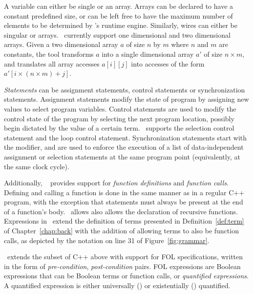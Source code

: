 A variable can either be single or an array. Arrays can be declared to 
have a constant predefined size, or can be left free to have the maximum
number of elements to be determined by \mytool's runtime engine.
Similarly, wires can either be singular or arrays. 
\mytool~currently support one dimensional and two dimensional arrays. 
Given a two dimensional array $a$ of size $n$ by $m$ where $n$ and $m$ are constants, 
the tool transforms $a$ into a single dimensional array $a'$ of size 
$n \times m$, and translates all array accesses $a[i][j]$ into accesses
of the form $a'[i \times (n \times m) + j]$. 


{\em Statements} can be assignment statements, control statements or 
synchronization statements. Assignment statements modify the state of
program by assigning new values to select program variables. Control 
statements are used to modify the control state of the program by 
selecting the next program location, possibly begin dictated by the 
value of a certain term. \mytool~supports the 
 selection control statement and the  loop
control statement. 
Synchronization statements start with the   
modifier, and are used to enforce the execution of a list of data-independent
assignment or selection statements at the same program point
(equivalently, at the same clock cycle).


Additionally, \mytool~ provides support for {\em function definitions} and 
{\em function calls}. Defining and calling a function is done in the same manner 
as in a regular C++ program, with the exception that 
statements must always be present at the end of a function's body.
\mytool~allows also allows the declaration of recursive functions.
Expressions in \psqlanguage~extend the definition of terms presented in 
Definition~\ref{def:term} of Chapter~\ref{chap:back} with the addition 
of allowing terms to also be function calls, as depicted by the notation
 on line 31 of Figure~\ref{fig:grammar}. 

\mytool~extends the subset of C++ above with support for FOL specifications,
written in the form of {\em pre-condition}, {\em post-condition}
pairs. FOL expressions are Boolean expressions that can be Boolean 
terms or function calls, or {\em quantified expressions}. A quantified expression 
is either universally () or existentially  () quantified.


